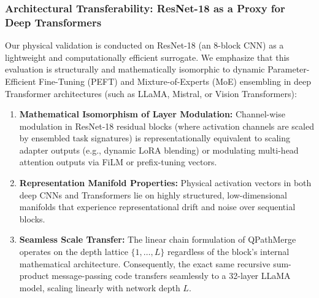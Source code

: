 \subsubsection{Architectural Transferability: ResNet-18 as a Proxy for Deep Transformers}
Our physical validation is conducted on ResNet-18 (an 8-block CNN) as a lightweight and computationally efficient surrogate. We emphasize that this evaluation is structurally and mathematically isomorphic to dynamic Parameter-Efficient Fine-Tuning (PEFT) and Mixture-of-Experts (MoE) ensembling in deep Transformer architectures (such as LLaMA, Mistral, or Vision Transformers):
\begin{enumerate}
    \item \textbf{Mathematical Isomorphism of Layer Modulation:} Channel-wise modulation in ResNet-18 residual blocks (where activation channels are scaled by ensembled task signatures) is representationally equivalent to scaling adapter outputs (e.g., dynamic LoRA blending) or modulating multi-head attention outputs via FiLM or prefix-tuning vectors.
    \item \textbf{Representation Manifold Properties:} Physical activation vectors in both deep CNNs and Transformers lie on highly structured, low-dimensional manifolds that experience representational drift and noise over sequential blocks.
    \item \textbf{Seamless Scale Transfer:} The linear chain formulation of QPathMerge operates on the depth lattice $\{1, \dots, L\}$ regardless of the block's internal mathematical architecture. Consequently, the exact same recursive sum-product message-passing code transfers seamlessly to a 32-layer LLaMA model, scaling linearly with network depth $L$.
\end{enumerate}
